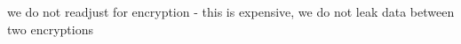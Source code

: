 we do not readjust for encryption - this is expensive, we do not leak data between two encryptions 
